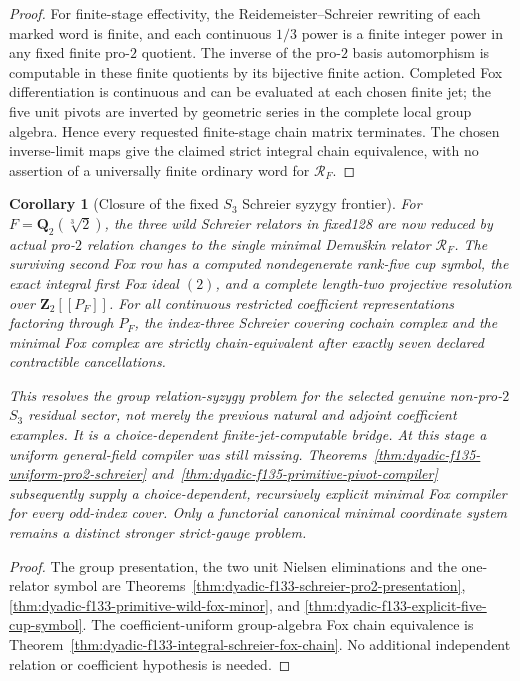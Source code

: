 \documentclass[11pt]{article}
\newtheorem{corollary}[theorem]{Corollary}
\theoremstyle{definition}
\begin{document}
\begin{proof}
For finite-stage
effectivity,
the Reidemeister--Schreier
rewriting of each
marked word
is finite, and
each continuous
$1/3$ power
is a finite
integer power
in any fixed
finite pro-$2$
quotient.
The inverse
of the pro-$2$
basis automorphism
is computable
in these finite
quotients by
its bijective
finite action.
Completed Fox
differentiation
is continuous
and can be
evaluated at
each chosen
finite jet;
the five
unit pivots
are inverted
by geometric
series in
the complete
local group
algebra.
Hence every
requested
finite-stage
chain matrix
terminates.
The chosen
inverse-limit
maps give the
claimed
strict integral
chain equivalence,
with no assertion
of a universally
finite ordinary
word for
$\mathscr R_F$.
\end{proof}

\begin{corollary}[Closure of the fixed $S_3$ Schreier syzygy frontier]
\label{cor:dyadic-f133-fixed-s3-syzygy-closure}
For
$F=\mathbf Q_2(\sqrt[3]2)$,
the three wild
Schreier relators
in fixed128
are now reduced
by \emph{actual}
pro-$2$ relation
changes to the
single minimal
Demu\v{s}kin relator
$\mathscr R_F$.
The surviving
second Fox row
has a computed
nondegenerate
rank-five
cup symbol,
the exact
integral first
Fox ideal $(2)$,
and a complete
length-two
projective
resolution over
$\mathbf Z_2[[P_F]]$.
For all
continuous
restricted
coefficient
representations
factoring through
$P_F$, the
index-three
Schreier
covering
cochain complex
and the
minimal Fox
complex are
strictly
chain-equivalent
after exactly
seven declared
contractible
cancellations.

This resolves
the \emph{group
relation-syzygy}
problem for the
selected genuine
non-pro-$2$
$S_3$ residual
sector, not
merely the
previous natural
and adjoint
coefficient
examples.
It is a
\emph{choice-dependent}
finite-jet-computable
bridge.
At this stage a
uniform general-field
compiler was still missing.
Theorems~\ref{thm:dyadic-f135-uniform-pro2-schreier}
and~\ref{thm:dyadic-f135-primitive-pivot-compiler}
subsequently supply a
choice-dependent, recursively explicit
minimal Fox compiler for every odd-index cover.
Only a \emph{functorial canonical} minimal
coordinate system remains a distinct
stronger strict-gauge problem.
\end{corollary}

\begin{proof}
The group
presentation,
the two unit
Nielsen eliminations
and the
one-relator
symbol are
Theorems~\ref{thm:dyadic-f133-schreier-pro2-presentation},
\ref{thm:dyadic-f133-primitive-wild-fox-minor},
and
\ref{thm:dyadic-f133-explicit-five-cup-symbol}.
The coefficient-uniform
group-algebra
Fox chain
equivalence is
Theorem~\ref{thm:dyadic-f133-integral-schreier-fox-chain}.
No additional
independent
relation or
coefficient
hypothesis is
needed.
\end{proof}
\end{document}
